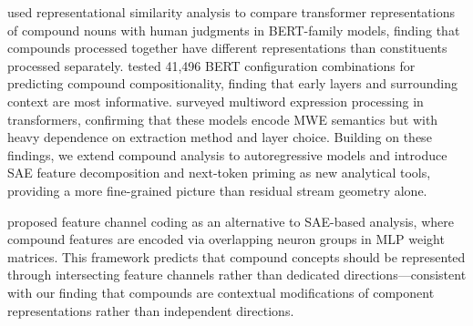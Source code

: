 \citet{ormerod2024kitchen} used representational similarity analysis to compare transformer representations of compound nouns with human judgments in BERT-family models, finding that compounds processed together have different representations than constituents processed separately.
\citet{miletic2023systematic} tested 41,496 BERT configuration combinations for predicting compound compositionality, finding that early layers and surrounding context are most informative.
\citet{nedumpozhimana2024semantics} surveyed multiword expression processing in transformers, confirming that these models encode MWE semantics but with heavy dependence on extraction method and layer choice.
Building on these findings, we extend compound analysis to autoregressive models and introduce SAE feature decomposition and next-token priming as new analytical tools, providing a more fine-grained picture than residual stream geometry alone.

\citet{adler2025combinatorial} proposed feature channel coding as an alternative to SAE-based analysis, where compound features are encoded via overlapping neuron groups in MLP weight matrices.
This framework predicts that compound concepts should be represented through intersecting feature channels rather than dedicated directions---consistent with our finding that compounds are contextual modifications of component representations rather than independent directions.
